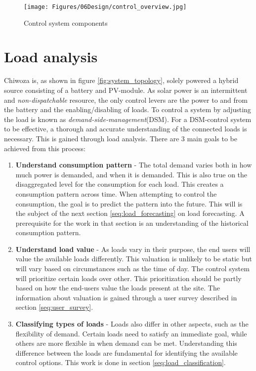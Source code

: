 \begin{figure}
    \centering
    \texttt{[image: Figures/06Design/control\_overview.jpg]}
    \caption[Control system components]{Control system components}
    \label{fig:control_syst}
\end{figure}


\section{Load analysis}

Chiwoza is, as shown in figure \ref{fig:system_topology}, solely powered a hybrid source consisting of a battery and PV-module. As solar power is an intermittent and \textit{non-dispatchable} resource, the only control levers are the power to and from the battery and the enabling/disabling of loads. To control a system by adjusting the load is known as \textit{demand-side-management}(DSM). For a DSM-control system to be effective, a thorough and accurate understanding of the connected loads is necessary. This is gained through load analysis. There are 3 main goals to be achieved from this process:
\begin{enumerate}
    \item \textbf{Understand consumption pattern}    - The total demand varies both in how much power is demanded, and when it is demanded. This is also true on the disaggregated level for the consumption for each load. This creates a consumption pattern across time. When attempting to control the consumption, the goal is to predict the pattern into the future. This will is the subject of the next section \ref{seq:load_forecasting} on load forecasting. A prerequisite for the work in that section is an understanding of the historical consumption pattern.
    \item \textbf{Understand load value}    -   As loads vary in their purpose, the end users will value the available loads differently. This valuation is unlikely to be static but will vary based on circumstances such as the time of day. The control system will prioritize certain loads over other. This prioritization should be partly based on how the end-users value the loads present at the site. The information about valuation is gained through a user survey described in section \ref{seq:user_survey}.
    \item \textbf{Classifying types of loads}   -   Loads also differ in other aspects, such as the flexibility of demand. Certain loads need to satisfy an immediate goal, while others are more flexible in when demand can be met. Understanding this difference between the loads are fundamental for identifying the available control options. This work is done in section \ref{seq:load_classification}.
\end{enumerate}

